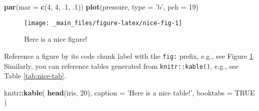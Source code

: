 \documentclass[]{book}
\newenvironment{Shaded}{\begin{snugshade}}{\end{snugshade}}
\newcommand{\DataTypeTok}[1]{\textcolor[rgb]{0.13,0.29,0.53}{#1}}
\newcommand{\DecValTok}[1]{\textcolor[rgb]{0.00,0.00,0.81}{#1}}
\newcommand{\FloatTok}[1]{\textcolor[rgb]{0.00,0.00,0.81}{#1}}
\newcommand{\KeywordTok}[1]{\textcolor[rgb]{0.13,0.29,0.53}{\textbf{#1}}}
\newcommand{\NormalTok}[1]{#1}
\newcommand{\OperatorTok}[1]{\textcolor[rgb]{0.81,0.36,0.00}{\textbf{#1}}}
\newcommand{\OtherTok}[1]{\textcolor[rgb]{0.56,0.35,0.01}{#1}}
\newcommand{\StringTok}[1]{\textcolor[rgb]{0.31,0.60,0.02}{#1}}
\begin{document}
\begin{Shaded}
\begin{Highlighting}[]
\KeywordTok{par}\NormalTok{(}\DataTypeTok{mar =} \KeywordTok{c}\NormalTok{(}\DecValTok{4}\NormalTok{, }\DecValTok{4}\NormalTok{, }\FloatTok{.1}\NormalTok{, }\FloatTok{.1}\NormalTok{))}
\KeywordTok{plot}\NormalTok{(pressure, }\DataTypeTok{type =} \StringTok{'b'}\NormalTok{, }\DataTypeTok{pch =} \DecValTok{19}\NormalTok{)}
\end{Highlighting}
\end{Shaded}

\begin{figure}

{\centering \texttt{[image: \_main\_files/figure-latex/nice-fig-1]} 

}

\caption{Here is a nice figure!}\label{fig:nice-fig}
\end{figure}

Reference a figure by its code chunk label with the \texttt{fig:} prefix, e.g., see Figure \ref{fig:nice-fig}. Similarly, you can reference tables generated from \texttt{knitr::kable()}, e.g., see Table \ref{tab:nice-tab}.

\begin{Shaded}
\begin{Highlighting}[]
\NormalTok{knitr}\OperatorTok{::}\KeywordTok{kable}\NormalTok{(}
  \KeywordTok{head}\NormalTok{(iris, }\DecValTok{20}\NormalTok{), }\DataTypeTok{caption =} \StringTok{'Here is a nice table!'}\NormalTok{,}
  \DataTypeTok{booktabs =} \OtherTok{TRUE}
\NormalTok{)}
\end{Highlighting}
\end{Shaded}
\end{document}
